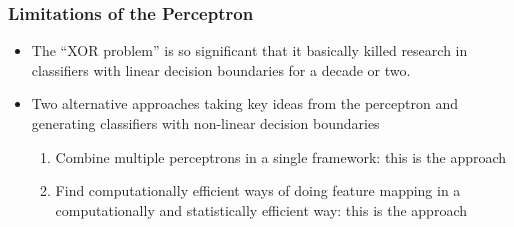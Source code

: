 \documentclass[trans]{beamer}
\begin{document}
\begin{frame}
  \frametitle{Limitations of the Perceptron}
\begin{itemize}
\item 
The ``XOR problem'' is so significant that it basically
killed research in classifiers with linear decision boundaries for a
decade or two.
\item Two alternative
approaches taking key ideas from the perceptron and generating
classifiers with non-linear decision boundaries
\begin{enumerate}
\item Combine multiple perceptrons in a single framework: this is the
 approach 
\item Find computationally efficient ways of doing
feature mapping in a computationally and statistically efficient way:
this is the  approach
\end{enumerate}
\end{itemize}
\end{frame}





%
%
%
%
\end{document}
